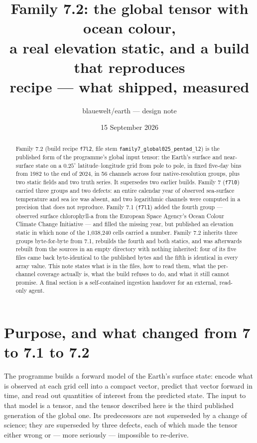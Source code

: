 \documentclass[10pt]{article}
\title{Family 7.2: the global tensor with ocean colour,\\
a real elevation static, and a build that reproduces\\
\large recipe \code{f7l2} --- what shipped, measured}
\author{blauewelt/earth --- design note}
\date{15 September 2026}
\newcommand{\code}[1]{\texttt{#1}}
\begin{document}
\maketitle

\begin{abstract}
Family 7.2 (build recipe \code{f7l2}, file stem
\code{family7\_global025\_pentad\_l2}) is the published form of the
programme's global input tensor: the Earth's surface and near-surface state on
a $0.25^\circ$ latitude--longitude grid from pole to pole, in fixed five-day
bins from 1982 to the end of 2024, in 56 channels across four
native-resolution groups, plus two static fields and two truth series. It
supersedes two earlier builds. Family 7 (\code{f7l0}) carried three groups and
two defects: an entire calendar year of observed sea-surface temperature and
sea ice was absent, and two logarithmic channels were computed in a precision
that does not reproduce. Family 7.1 (\code{f7l1}) added the fourth group ---
observed surface chlorophyll-a from the European Space Agency's Ocean Colour
Climate Change Initiative --- and filled the missing year, but published an elevation static
in which none of the 1,038,240 cells carried a number. Family 7.2 inherits
three groups byte-for-byte from 7.1, rebuilds the fourth and both statics, and
was afterwards rebuilt from the sources in an empty directory with nothing
inherited: four of its five files came back byte-identical to the published
bytes and the fifth is identical in every array value. This note states what
is in the files, how to read them, what the per-channel coverage actually is,
what the build refuses to do, and what it still cannot promise. A final
section is a self-contained ingestion handover for an external, read-only
agent.
\end{abstract}

\section{Purpose, and what changed from 7 to 7.1 to 7.2}

The programme builds a forward model of the Earth's surface state: encode what
is observed at each grid cell into a compact vector, predict that vector
forward in time, and read out quantities of interest from the predicted state.
The input to that model is a tensor, and the tensor described here is the third
published generation of the global one. Its predecessors are not superseded by
a change of science; they are superseded by three defects, each of which made
the tensor either wrong or --- more seriously --- impossible to re-derive.
\end{document}
